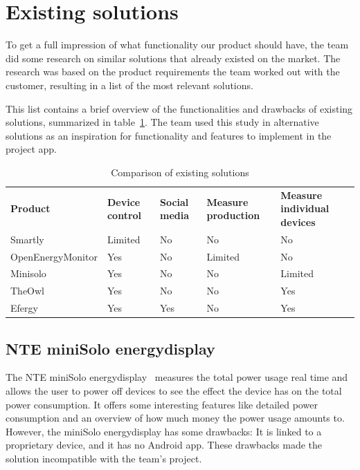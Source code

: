\newpage
\section{Existing solutions}
\label{sec:altsolution}

To get a full impression of what functionality our product should have, the team did some research on similar solutions that already existed on the market. The research was based on the product requirements the team worked out with the customer, resulting in a list of the most relevant solutions.
 
This list contains a brief overview of the functionalities and drawbacks of existing solutions, summarized in table~\ref{tab:existingSolutions}. The team used this study in alternative solutions as an inspiration for functionality and features to implement in the project app.


\begin{table}[H]
\centering
{}
\begin{tabular}{|l|l|p{2.6cm}|p{2.3cm}|p{2.2cm}|}
\hline
\textbf{Product} & \textbf{Device control} & \textbf{Social media} & \textbf{Measure production} & \textbf{Measure individual devices} \\
Smartly & Limited & No  & No & No\\
OpenEnergyMonitor & Yes & No  & Limited & No \\
Minisolo & Yes & No  & No & Limited\\
TheOwl & Yes & No & No & Yes\\
Efergy & Yes & Yes &  No & Yes\\\hline
\end{tabular}
\caption{Comparison of existing solutions}
\label{tab:existingSolutions}
\end{table}


\subsection{NTE miniSolo energydisplay}

The NTE miniSolo energydisplay~\cite{nte} measures the total power usage real time and allows the user to power off devices to see the effect the device has on the total power consumption. It offers some interesting features like detailed power consumption and an overview of how much money the power usage amounts to. However, the miniSolo energydisplay has some drawbacks: It is linked to a proprietary device, and it has no Android app. These drawbacks made the solution incompatible with the team's project.


